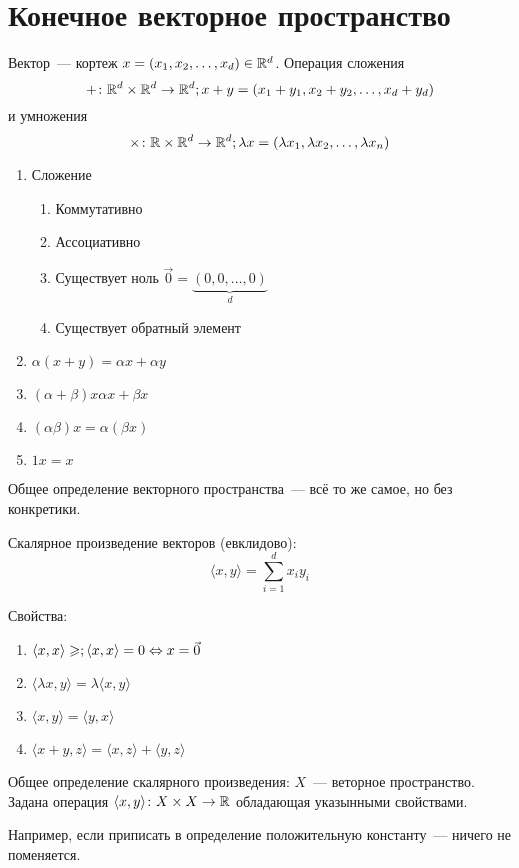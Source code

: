 \section{Конечное векторное пространство}

\begin{Def}
Вектор~--- кортеж $x = (x_1, x_2, \ldots, x_d) \in \mathbb{R}^d$. Операция сложения 
$$+\colon \mathbb{R}^d \times \mathbb{R}^d \rightarrow \mathbb{R}^d;x+y = (x_1+y_1, x_2+y_2, \ldots, x_d + y_d)$$ 
и умножения 
$$\times\colon \mathbb{R} \times \mathbb{R}^d \rightarrow \mathbb{R}^d; \lambda x = (\lambda x_1, \lambda x_2, \ldots, \lambda x_n)$$
\end{Def}
\begin{enumerate}
\item Сложение
\begin{enumerate}
\item Коммутативно
\item Ассоциативно
\item Существует ноль $\vec 0 = \underbrace{(0, 0, \ldots, 0)}_d$
\item Существует обратный элемент
\end{enumerate}
\item $\alpha (x + y) = \alpha x + \alpha y$
\item $(\alpha + \beta) x \alpha x + \beta x$
\item $(\alpha\beta)x = \alpha(\beta x)$
\item $1x = x$
\end{enumerate}
\begin{Def}
Общее определение векторного пространства~--- всё то же самое, но без конкретики.
\end{Def}

\begin{Def}
Скалярное произведение векторов (евклидово):
$$\langle x, y\rangle = \sum_{i=1}^d x_iy_i$$
\end{Def}
Свойства:~%
\begin{enumerate}
\item $\langle x, x\rangle \geqslant; \langle x, x\rangle = 0 \Leftrightarrow x = \vec 0$
\item $\langle \lambda x, y\rangle = \lambda \langle x, y\rangle$
\item $\langle x, y\rangle = \langle y, x\rangle$
\item $\langle x + y, z\rangle = \langle x, z\rangle + \langle y, z\rangle$
\end{enumerate}

\begin{Def}
Общее определение скалярного произведения: $X$~--- веторное пространство. Задана операция $\langle x,y\rangle\colon X \times X \rightarrow \mathbb{R}$ обладающая указынными свойствами.
\end{Def}
Например, если приписать в определение положительную константу~--- ничего не поменяется.

